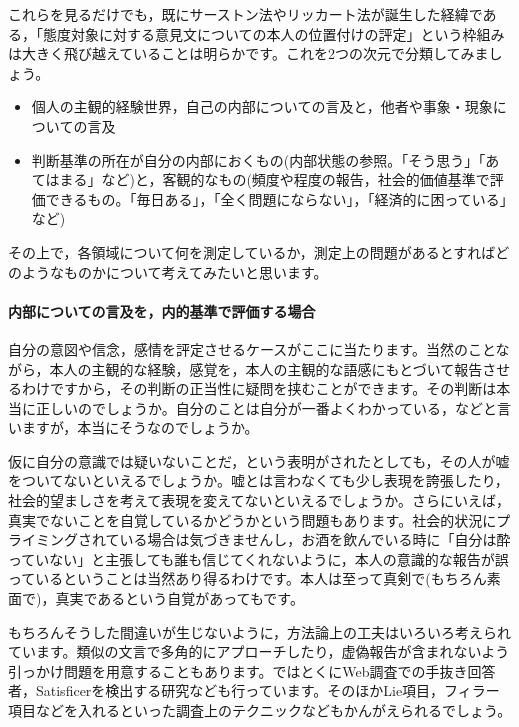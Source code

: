 \documentclass{ltjsbook}
\begin{document}
これらを見るだけでも，既にサーストン法やリッカート法が誕生した経緯である，「態度対象に対する意見文についての本人の位置付けの評定」という枠組みは大きく飛び越えていることは明らかです。これを2つの次元で分類してみましょう。
\begin{itemize}
	\item 個人の主観的経験世界，自己の内部についての言及と，他者や事象・現象についての言及
	\item 判断基準の所在が自分の内部におくもの(内部状態の参照。「そう思う」「あてはまる」など)と，客観的なもの(頻度や程度の報告，社会的価値基準で評価できるもの。「毎日ある」，「全く問題にならない」，「経済的に困っている」など)
\end{itemize}
その上で，各領域について何を測定しているか，測定上の問題があるとすればどのようなものかについて考えてみたいと思います。
\paragraph{内部についての言及を，内的基準で評価する場合}
自分の意図や信念，感情を評定させるケースがここに当たります。当然のことながら，本人の主観的な経験，感覚を，本人の主観的な語感にもとづいて報告させるわけですから，その判断の正当性に疑問を挟むことができます。その判断は本当に正しいのでしょうか。自分のことは自分が一番よくわかっている，などと言いますが，本当にそうなのでしょうか。

仮に自分の意識では疑いないことだ，という表明がされたとしても，その人が嘘をついてないといえるでしょうか。嘘とは言わなくても少し表現を誇張したり，社会的望ましさを考えて表現を変えてないといえるでしょうか。さらにいえば，真実でないことを自覚しているかどうかという問題もあります。社会的状況にプライミングされている場合は気づきませんし，お酒を飲んでいる時に「自分は酔っていない」と主張しても誰も信じてくれないように，本人の意識的な報告が誤っているということは当然あり得るわけです。本人は至って真剣で(もちろん素面で)，真実であるという自覚があってもです。

もちろんそうした間違いが生じないように，方法論上の工夫はいろいろ考えられています。類似の文言で多角的にアプローチしたり，虚偽報告が含まれないよう引っかけ問題を用意することもあります。\textcite{MiuraAsako2015}ではとくにWeb調査での手抜き回答者，Satisficerを検出する研究なども行っています。そのほかLie項目，フィラー項目などを入れるといった調査上のテクニックなどもかんがえられるでしょう。
\end{document}
